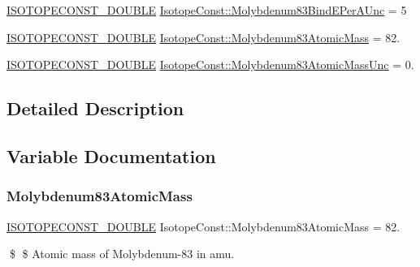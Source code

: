 \begin{DoxyCompactItemize}
\mbox{\hyperlink{group___isotope_const-_macros_ga8f45a7272ce02c0b4c65c44636ed719a}{I\+S\+O\+T\+O\+P\+E\+C\+O\+N\+S\+T\+\_\+\+D\+O\+U\+B\+LE}} \mbox{\hyperlink{group___isotope_const-_molybdenum-_mo83_ga83376e97b56a902add449213feb16975}{Isotope\+Const\+::\+Molybdenum83\+Bind\+E\+Per\+A\+Unc}} = 5
\item 
\mbox{\hyperlink{group___isotope_const-_macros_ga8f45a7272ce02c0b4c65c44636ed719a}{I\+S\+O\+T\+O\+P\+E\+C\+O\+N\+S\+T\+\_\+\+D\+O\+U\+B\+LE}} \mbox{\hyperlink{group___isotope_const-_molybdenum-_mo83_gad103dcb554938e5f46e5f1454756b7f5}{Isotope\+Const\+::\+Molybdenum83\+Atomic\+Mass}} = 82.
\item 
\mbox{\hyperlink{group___isotope_const-_macros_ga8f45a7272ce02c0b4c65c44636ed719a}{I\+S\+O\+T\+O\+P\+E\+C\+O\+N\+S\+T\+\_\+\+D\+O\+U\+B\+LE}} \mbox{\hyperlink{group___isotope_const-_molybdenum-_mo83_ga952334e5612f04ab647983d48f9279fe}{Isotope\+Const\+::\+Molybdenum83\+Atomic\+Mass\+Unc}} = 0.
\end{DoxyCompactItemize}


\subsection{Detailed Description}


\subsection{Variable Documentation}
\mbox{\label{group___isotope_const-_molybdenum-_mo83_gad103dcb554938e5f46e5f1454756b7f5}} 
\subsubsection{\texorpdfstring{Molybdenum83\+Atomic\+Mass}{Molybdenum83AtomicMass}}
{\footnotesize\ttfamily \mbox{\hyperlink{group___isotope_const-_macros_ga8f45a7272ce02c0b4c65c44636ed719a}{I\+S\+O\+T\+O\+P\+E\+C\+O\+N\+S\+T\+\_\+\+D\+O\+U\+B\+LE}} Isotope\+Const\+::\+Molybdenum83\+Atomic\+Mass = 82.}

\$ \$ Atomic mass of Molybdenum-\/83 in amu. \mbox{\label{group___isotope_const-_molybdenum-_mo83_ga952334e5612f04ab647983d48f9279fe}} 
